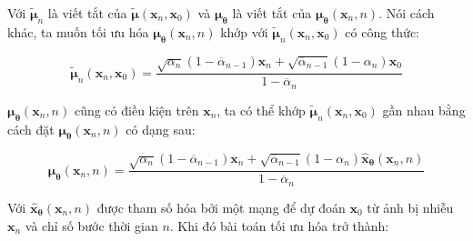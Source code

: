 \documentclass[14pt, a4paper]{article}
\numberwithin{equation}{section}
\numberwithin{figure}{section}
\numberwithin{dl}{section}
\numberwithin{md}{section}
\numberwithin{bd}{section}
\numberwithin{dn}{section}
\numberwithin{hq}{section}
\begin{document}
    Với $\tilde{\boldsymbol{\mu}}_n$ là viết tắt của $\tilde{\boldsymbol{\mu}} (\boldsymbol{x}_n, \boldsymbol{x}_0)$ và $\boldsymbol{\mu}_{\boldsymbol{\theta}}$ là viết tắt của $\boldsymbol{\mu}_{\boldsymbol{\theta}}(\boldsymbol{x}_n, n)$.
    Nói cách khác, ta muốn tối ưu hóa $\boldsymbol{\mu}_{\boldsymbol{\theta}} (\boldsymbol{x}_n, n)$ khớp với $\tilde{\boldsymbol{\mu}}_n (\boldsymbol{x}_n, \boldsymbol{x}_0)$ có công thức:

    \begin{equation}
        \tilde{\boldsymbol{\mu}}_n (\boldsymbol{x}_n, \boldsymbol{x}_0) = \dfrac{\sqrt{\alpha_n}(1 - \overline{\alpha}_{n-1})\boldsymbol{x}_n + \sqrt{\overline{\alpha}_{n-1}}(1 - \alpha_n) \boldsymbol{x}_0}{1 - \overline{\alpha}_n}
    \end{equation}

    $\boldsymbol{\mu}_{\boldsymbol{\theta}} (\boldsymbol{x}_n, n)$ cũng có điều kiện trên $\boldsymbol{x}_n$, ta có thể khớp $\tilde{\boldsymbol{\mu}}_n (\boldsymbol{x}_n, \boldsymbol{x}_0)$ gần nhau bằng cách đặt $\boldsymbol{\mu}_{\boldsymbol{\theta}} (\boldsymbol{x}_n, n)$ có dạng sau:

    \begin{equation}
        \boldsymbol{\mu}_{\boldsymbol{\theta}} (\boldsymbol{x}_n, n) = \dfrac{\sqrt{\alpha_n}(1 - \overline{\alpha}_{n-1})\boldsymbol{x}_n + \sqrt{\overline{\alpha}_{n-1}}(1 - \alpha_n) \hat{\boldsymbol{x}}_{\boldsymbol{\theta}} (\boldsymbol{x}_n, n)}{1 - \overline{\alpha}_n}
    \end{equation}

    Với $\hat{\boldsymbol{x}}_{\boldsymbol{\theta}} (\boldsymbol{x}_n, n)$ được tham số hóa bởi một mạng để dự đoán $\boldsymbol{x}_0$ từ ảnh bị nhiễu $\boldsymbol{x}_n$ và chỉ số bước thời gian $n$.
    Khi đó bài toán tối ưu hóa trở thành:
\end{document}
